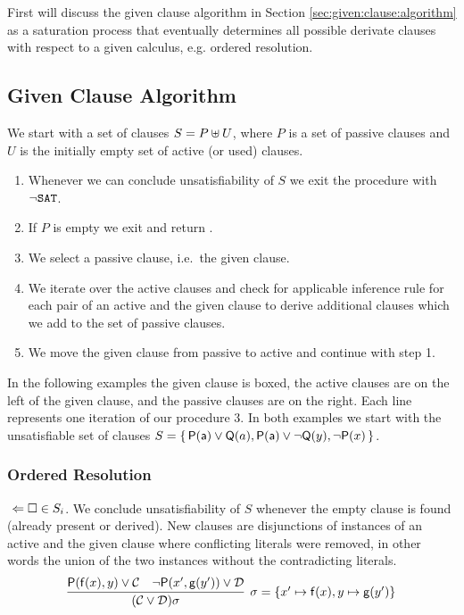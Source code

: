 First will discuss the given clause algorithm in Section \ref{sec:given:clause:algorithm}
as a saturation process that eventually determines all possible derivate clauses
with respect to a given calculus, e.g. ordered resolution.

\subsection{Given Clause Algorithm}

\begin{procedure}
	We start with a set of clauses $S = P \uplus U$, 
	where $P$ is a set of {\myem passive} clauses 
	and $U$ is the initially empty set of {\myem active} (or used) clauses.
	\begin{enumerate}
		\item[\jek] Whenever we can conclude unsatisfiability of $S$ 
		we exit the procedure with $\lnot\texttt{SAT}$.
		\setcounter{enumi}{0}
		\item If $P$ is empty we exit and return \SAT.
		\item We select a passive clause, i.e.~the given clause. \jek
		\item We iterate over the active clauses and check for applicable inference rule
		for each pair of an active and the given clause
		to derive additional clauses which we add to the set of passive clauses. \jek
		\item We move the given clause from passive to active and continue with step 1.
	\end{enumerate}
\end{procedure}


In the following examples the given clause is boxed, 
the active clauses are on the left of the given clause, 
and the passive clauses are on the right. 
Each line represents one iteration of our procedure 3.
%
In both examples we start with the unsatisfiable set of clauses $S=\{\, {\mathsf P}({\mathsf a})\lor{\mathsf Q}(a), {\mathsf P}({\mathsf a})\lor\lnot{\mathsf Q}(y), \lnot{\mathsf P}(x) \,\}$.

\subsubsection{Ordered Resolution}

\jek$\ \Leftarrow\square\in S_i$. We conclude unsatisfiability of $S$ whenever the empty clause is found (already present or derived).
New clauses are disjunctions of instances of an active and the given clause where conflicting literals were removed, 
in other words the union of the two instances without the contradicting literals.
\begin{gather*}
\infer[\sigma=\{ x'\mapsto\mf(x), y\mapsto\mg(y') \}]{
	(\mcC \lor \mcD)\sigma
}{
	\mP(\mf(x), y) \lor \mcC & \lnot\mP(x',\mg(y')) \lor \mcD
}
\end{gather*}

